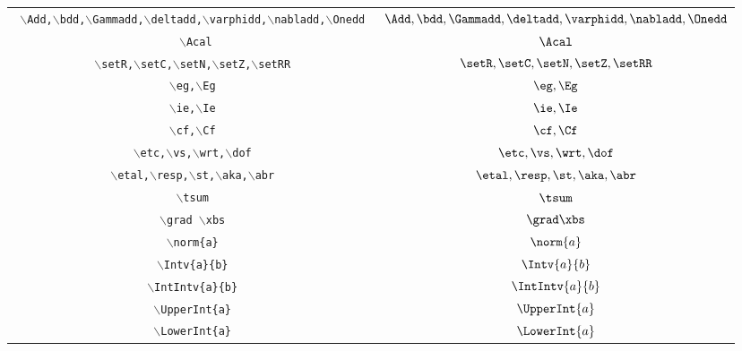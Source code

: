 \documentclass[a4paper,twoside,12pt]{article}
\begin{document}
\begin{table}[h]
\begin{tabular}{|c|c|}
\texttt{   $\backslash$Add,$\backslash$bdd,$\backslash$Gammadd,$\backslash$deltadd,$\backslash$varphidd,$\backslash$nabladd,$\backslash$Onedd } & $     \Add,\bdd,\Gammadd,\deltadd,\varphidd,\nabladd,\Onedd $\\
\texttt{   $\backslash$Acal}& $     \Acal $\\
\texttt{   $\backslash$setR,$\backslash$setC,$\backslash$setN,$\backslash$setZ,$\backslash$setRR }& $     \setR,\setC,\setN,\setZ,\setRR    $\\
\texttt{    $\backslash$eg,$\backslash$Eg   } & $     \eg,\Eg   $\\
\texttt{    $\backslash$ie,$\backslash$Ie   } & $     \ie,\Ie   $\\
\texttt{    $\backslash$cf,$\backslash$Cf   } & $     \cf,\Cf   $\\
\texttt{   $\backslash$etc,$\backslash$vs,$\backslash$wrt,$\backslash$dof    } & $     \etc,\vs,\wrt,\dof    $\\
\texttt{    $\backslash$etal,$\backslash$resp,$\backslash$st,$\backslash$aka,$\backslash$abr } & $     \etal,\resp,\st,\aka,\abr $\\
\texttt{    $\backslash$tsum } & $     \tsum $\\
\texttt{    $\backslash$grad $\backslash$xbs    } & $     \grad \xbs    $\\
\texttt{    $\backslash$norm\{a\}  } & $     \norm{a}  $\\
\texttt{$\backslash$Intv\{a\}\{b\}}&$\Intv{a}{b}$\\
\texttt{$\backslash$IntIntv\{a\}\{b\}}&$\IntIntv{a}{b}$\\
\texttt{$\backslash$UpperInt\{a\}}&$\UpperInt{a}$\\
\texttt{$\backslash$LowerInt\{a\}}&$\LowerInt{a}$\\
\hline
\end{tabular}
\end{table}
\end{document}
